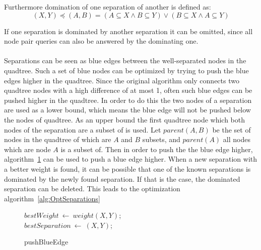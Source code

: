 \documentclass{article}
\begin{document}
Furthermore domination of one separation of another is defined as:
\begin{equation*}
  (X, Y) \preceq (A, B) = (A \subseteq X \land B \subseteq Y) \lor (B \subseteq X \land A \subseteq Y)
\end{equation*}

If one separation is dominated by another separation it can be omitted, since all node pair queries can also be answered by the
dominating one.\\

\quad\\

Separations can be seen as blue edges between the well-separated nodes in the quadtree. Such a set of blue nodes can be optimized by
trying to push the blue edges higher in the quadtree. Since the original algorithm only connects two quadtree nodes with a high difference of at most
1, often such blue edges can be pushed higher in the quadtree. In order to do this the two nodes of a separation are used as a lower bound,
which means the blue edge will not be pushed below the nodes of quadtree.
As an upper bound the first quadtree node which both nodes of the separation are a subset of is used.
Let $parent(A, B)$ be the set of nodes in the quadtree of which are $A$ and $B$ subsets, and $parent(A)$ all nodes which are node $A$ is a subset of.
Then in order to push the the blue edge higher, algorithm~\ref{alg:pushBlueEdge} can be used to push a blue edge higher.
When a new separation with a better weight is found, it can be possible that one of the known separations is dominated by the newly found separation.
If that is the case, the dominated separation can be deleted. This leads to the optimization algorithm~\ref{alg:OptSeparations}

\begin{figure}[ht!]
  \begin{algorithm}[H]
    $bestWeight~\longleftarrow~weight(X, Y)$;\\
    $bestSeparation~\longleftarrow~(X, Y)$;\\


    \caption{pushBlueEdge}
    \label{alg:pushBlueEdge}
  \end{algorithm}
\end{figure}
\end{document}
